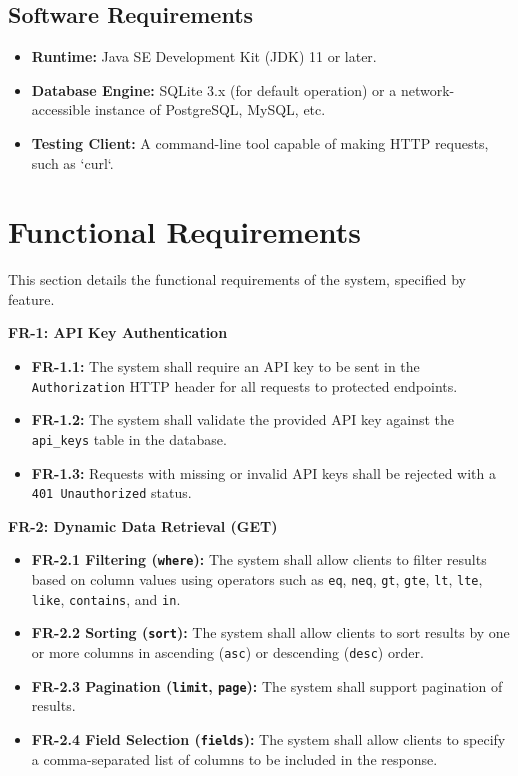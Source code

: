 \documentclass[12pt, a4paper]{report}
\begin{document}
\subsection{Software Requirements}
\begin{itemize}
    \item \textbf{Runtime:} Java SE Development Kit (JDK) 11 or later.
    \item \textbf{Database Engine:} SQLite 3.x (for default operation) or a network-accessible instance of PostgreSQL, MySQL, etc.
    \item \textbf{Testing Client:} A command-line tool capable of making HTTP requests, such as `curl`.
\end{itemize}

\section{Functional Requirements}
This section details the functional requirements of the system, specified by feature.

\noindent %
\textbf{FR-1: API Key Authentication}
\begin{itemize}
    \item \textbf{FR-1.1:} The system shall require an API key to be sent in the \lstinline|Authorization| HTTP header for all requests to protected endpoints.
    \item \textbf{FR-1.2:} The system shall validate the provided API key against the \lstinline|api_keys| table in the database.
    \item \textbf{FR-1.3:} Requests with missing or invalid API keys shall be rejected with a \lstinline|401 Unauthorized| status.
\end{itemize}

\noindent\textbf{FR-2: Dynamic Data Retrieval (GET)}
\begin{itemize}
    \item \textbf{FR-2.1 Filtering (\lstinline|where|):} The system shall allow clients to filter results based on column values using operators such as \lstinline|eq|, \lstinline|neq|, \lstinline|gt|, \lstinline|gte|, \lstinline|lt|, \lstinline|lte|, \lstinline|like|, \lstinline|contains|, and \lstinline|in|.
    \item \textbf{FR-2.2 Sorting (\lstinline|sort|):} The system shall allow clients to sort results by one or more columns in ascending (\lstinline|asc|) or descending (\lstinline|desc|) order.
    \item \textbf{FR-2.3 Pagination (\lstinline|limit|, \lstinline|page|):} The system shall support pagination of results.
    \item \textbf{FR-2.4 Field Selection (\lstinline|fields|):} The system shall allow clients to specify a comma-separated list of columns to be included in the response.
\end{itemize}
\end{document}
